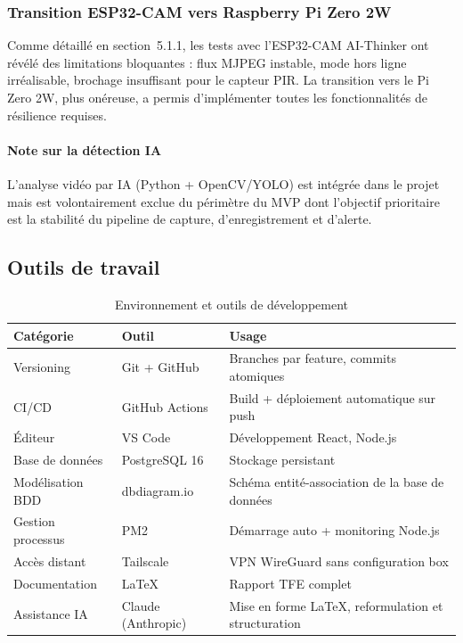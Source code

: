 \documentclass[12pt,a4paper]{article}
\begin{document}
\subsubsection{Transition ESP32-CAM vers Raspberry Pi Zero 2W}
Comme détaillé en section~5.1.1, les tests avec l'ESP32-CAM AI-Thinker ont révélé des limitations bloquantes : flux MJPEG instable, mode hors ligne irréalisable, brochage insuffisant pour le capteur PIR. La transition vers le Pi Zero 2W, plus onéreuse, a permis d'implémenter toutes les fonctionnalités de résilience requises.

\paragraph{Note sur la détection IA}
L'analyse vidéo par IA (Python + OpenCV/YOLO) est intégrée dans le projet mais est volontairement exclue du périmètre du MVP dont l'objectif prioritaire est la stabilité du pipeline de capture, d'enregistrement et d'alerte.

\subsection{Outils de travail}

\begin{table}[H]
\centering
\small
\begin{tabular}{|l|l|p{6cm}|}
\hline
\textbf{Catégorie} & \textbf{Outil} & \textbf{Usage} \\
\hline
Versioning & Git + GitHub & Branches par feature, commits atomiques \\
\hline
CI/CD & GitHub Actions & Build + déploiement automatique sur push \\
\hline
Éditeur & VS Code & Développement React, Node.js \\
\hline
Base de données & PostgreSQL 16 & Stockage persistant \\
\hline
Modélisation BDD & dbdiagram.io & Schéma entité-association de la base de données \\
\hline
Gestion processus & PM2 & Démarrage auto + monitoring Node.js \\
\hline
Accès distant & Tailscale & VPN WireGuard sans configuration box \\
\hline
Documentation & \LaTeX{} & Rapport TFE complet \\
\hline
Assistance IA & Claude (Anthropic) & Mise en forme \LaTeX{}, reformulation et structuration \\
\hline
\end{tabular}
\caption{Environnement et outils de développement}
\end{table}
\end{document}
